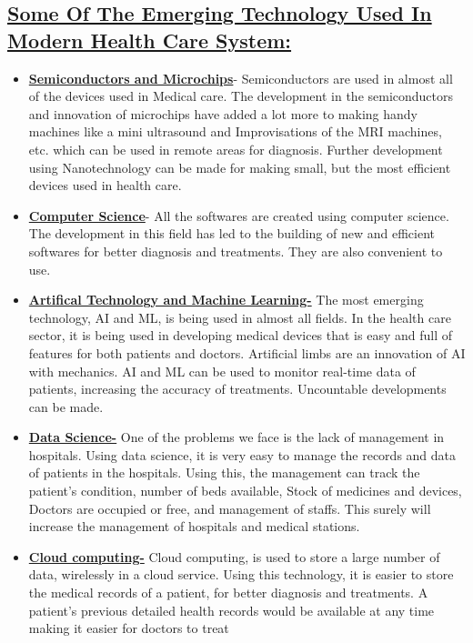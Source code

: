 \documentclass[12pt]{article}
\begin{document}
\subsection{\underline{Some Of The Emerging Technology Used In Modern Health Care System:}}
\begin{itemize}
\item \textbf{\underline{Semiconductors and Microchips}}-
\newline Semiconductors are used in almost all of the devices used in Medical care. The development in the semiconductors and innovation of microchips have added a lot more to making handy machines like a mini ultrasound and Improvisations of the MRI machines, etc. which can be used in remote areas for diagnosis. Further development using Nanotechnology can be made for making small, but the most efficient devices used in health care.
\item \textbf{\underline{Computer Science}}- 
\newline All the softwares are created using computer science. The development in this field has led to the building of new and efficient softwares for better diagnosis and treatments. They are also convenient to use.
\item \textbf{\underline{Artifical Technology and Machine Learning-}}
\newline The most emerging technology, AI and ML, is being used in almost all fields. In the health care sector, it is being used in developing medical devices that is easy and full of features for both patients and doctors. Artificial limbs are an innovation of AI with mechanics. AI and ML can be used to monitor real-time data of patients, increasing the accuracy of treatments. Uncountable developments can be made.
\item \textbf{\underline{Data Science-}}
\newline One of the problems we face is the lack of management in hospitals. Using data science, it is very easy to manage the records and data of patients in the hospitals. Using this, the management can track the patient’s condition, number of beds available, Stock of medicines and devices, Doctors are occupied or free, and management of staffs. This surely will increase the management of hospitals and medical stations.
\item \textbf{\underline{Cloud computing-}}
\newline  Cloud computing, is used to store a large number of data, wirelessly in a cloud service. Using this technology, it is easier to store the medical records of a patient, for better diagnosis and treatments. A patient’s previous detailed health records would be available at any time making it easier for doctors to treat
\end{itemize}
\end{document}
